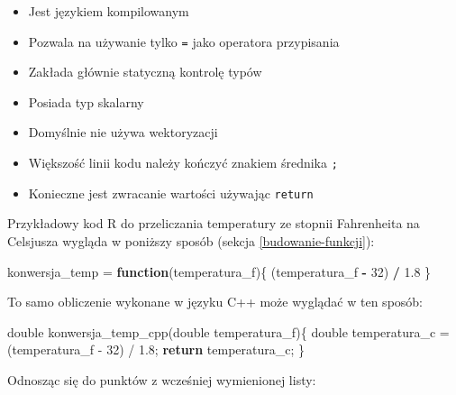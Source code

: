 \documentclass[paper=6in:9in,pagesize=pdftex,headinclude=on,footinclude=on,10pt]{scrbook}
\newenvironment{Shaded}{\begin{snugshade}}{\end{snugshade}}
\newcommand{\ControlFlowTok}[1]{\textcolor[rgb]{0.13,0.29,0.53}{\textbf{#1}}}
\newcommand{\DataTypeTok}[1]{\textcolor[rgb]{0.13,0.29,0.53}{#1}}
\newcommand{\DecValTok}[1]{\textcolor[rgb]{0.00,0.00,0.81}{#1}}
\newcommand{\FloatTok}[1]{\textcolor[rgb]{0.00,0.00,0.81}{#1}}
\newcommand{\NormalTok}[1]{#1}
\newcommand{\OperatorTok}[1]{\textcolor[rgb]{0.81,0.36,0.00}{\textbf{#1}}}
\newcommand{\StringTok}[1]{\textcolor[rgb]{0.31,0.60,0.02}{#1}}
\providecommand{\tightlist}{%
  \setlength{\itemsep}{0pt}\setlength{\parskip}{0pt}}
\begin{document}
\begin{itemize}
\tightlist
\item
  Jest językiem kompilowanym
\item
  Pozwala na używanie tylko \texttt{=} jako operatora przypisania
\item
  Zakłada głównie statyczną kontrolę typów
\item
  Posiada typ skalarny
\item
  Domyślnie nie używa wektoryzacji
\item
  Większość linii kodu należy kończyć znakiem średnika \texttt{;}
\item
  Konieczne jest zwracanie wartości używając \texttt{return}
\end{itemize}

Przykładowy kod R do przeliczania temperatury ze stopnii Fahrenheita na Celsjusza wygląda w poniższy sposób (sekcja \ref{budowanie-funkcji}):

\begin{Shaded}
\begin{Highlighting}[]
\NormalTok{konwersja_temp =}\StringTok{ }\ControlFlowTok{function}\NormalTok{(temperatura_f)\{}
\NormalTok{    (temperatura_f }\OperatorTok{-}\StringTok{ }\DecValTok{32}\NormalTok{) }\OperatorTok{/}\StringTok{ }\FloatTok{1.8}
\NormalTok{\}}
\end{Highlighting}
\end{Shaded}

To samo obliczenie wykonane w języku C++ może wyglądać w ten sposób:

\begin{Shaded}
\begin{Highlighting}[]
\DataTypeTok{double}\NormalTok{ konwersja_temp_cpp(}\DataTypeTok{double}\NormalTok{ temperatura_f)\{}
  \DataTypeTok{double}\NormalTok{ temperatura_c = (temperatura_f - }\DecValTok{32}\NormalTok{) / }\FloatTok{1.8}\NormalTok{;}
  \ControlFlowTok{return}\NormalTok{ temperatura_c;}
\NormalTok{\}}
\end{Highlighting}
\end{Shaded}

Odnosząc się do punktów z wcześniej wymienionej listy:
\end{document}
